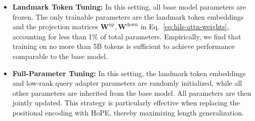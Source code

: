 \begin{itemize}[leftmargin=*,itemsep=0.2em,topsep=0.3em]
\item \textbf{Landmark Token Tuning:}
In this setting, all base model parameters are frozen. The only trainable parameters are the landmark token embeddings and the projection matrices $\mathbf{W}^{\text{up}}, \mathbf{W}^{\text{down}}$ in Eq.~\eqref{eq:hils-attn-weights}, accounting for less than 1\% of total parameters. Empirically, we find that training on no more than 5B tokens is sufficient to achieve performance comparable to the base model. 
\item \textbf{Full-Parameter Tuning:}
In this setting, the landmark token embeddings and low-rank query adapter parameters are randomly initialized, while all other parameters are inherited from the base model. All parameters are then jointly updated. This strategy is particularly effective when replacing the positional encoding with HoPE, thereby maximizing length generalization.
\end{itemize}

